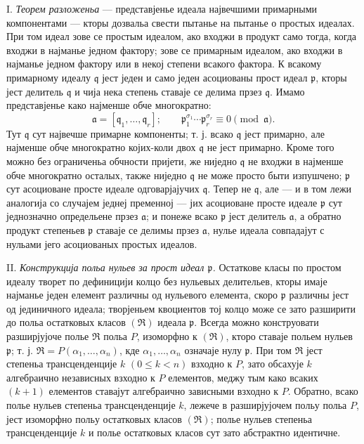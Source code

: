 ﻿\documentclass[11pt]{article}
\providecommand{\fraka}{\mathfrak a}
\providecommand{\frakp}{\mathfrak p}
\providecommand{\frakq}{\mathfrak q}
\providecommand{\frakR}{\mathfrak R}
\begin{document}
\noindent I. \emph{Теорем разложеньа} --- представјенье идеала највечшими примарными компонентами --- кторы дозвальа свести пытанье на пытанье о простых идеалах. При том идеал зове се простым идеалом, ако входжи в продукт само тогда, когда входжи в најманье једном фактору; зове се примарным идеалом, ако входжи в најманье једном фактору или в некој степени всакого фактора. К всакому примарному идеалу $\frakq$ јест једен и само једен асоциованы прост идеал $\frakp$, кторы јест делитель $\frakq$ и чија нека степень ставаје се делима прзез $\frakq$. Имамо представјенье како најменше обче многократно:
\[
 \fraka=[\frakq_1,\ldots,\frakq_r];\qquad
 \frakp_1^{\sigma_1}\cdots \frakp_r^{\sigma_r}\equiv 0\pmod{\fraka}.
\]
Тут $\frakq$ сут највечше примарне компоненты; т. ј. всако $\frakq$ јест примарно, але најменше обче многократно којих-коли двох $\frakq$ не јест примарно. Кроме того можно без ограниченьа обчности пријети, же ниједно $\frakq$ не входжи в најменше обче многократно осталых, также ниједно $\frakq$ не може просто быти изпушчено; $\frakp$ сут асоциоване просте идеале одговарјајучих $\frakq$. Тепер не $\frakq$, але --- и в том лежи аналогија со случајем једнеј пременној --- јих асоциоване просте идеале $\frakp$ сут једнозначно определьене прзез $\fraka$; и понеже всако $\frakp$ јест делитель $\fraka$, а обратно продукт степеньев $\frakp$ ставаје се делимы прзез $\fraka$, нулье идеала совпадајут с нульами јего асоциованых простых идеалов.

\noindent II. \emph{Конструкција польа нульев за прост идеал $\frakp$.} Остаткове класы по простом идеалу творет по дефиницији колцо без нульевых делительев, кторы имаје најманье једен елемент различны од нульевого елемента, скоро $\frakp$ различны јест од јединичного идеала; творјеньем квоциентов тој колцо може се зато разширити до польа остатковых класов $(\frakR)$ идеала $\frakp$. Всегда можно конструовати разширјујоче полье $\frakR$ польа $P$, изоморфно к $(\frakR)$, кторо ставаје польем нульев $\frakp$; т. ј. $\frakR=P(\alpha_1,\ldots,\alpha_n)$, кде $\alpha_1,\ldots,\alpha_n$ означаје нулу $\frakp$. При том $\frakR$ јест степеньа трансценденције $k$ $(0\leq k<n)$ взходно к $P$, зато обсахује $k$ алгебраично независных взходно к $P$ елементов, меджу тым како всаких $(k+1)$ елементов ставајут алгебраично зависными взходно к $P$. Обратно, всако полье нульев степеньа трансценденције $k$, лежече в разширјујочем польу польа $P$, јест изоморфно польу остатковых класов $(\frakR)$; полье нульев степеньа трансценденције $k$ и полье остатковых класов сут зато абстрактно идентичне.
\end{document}
